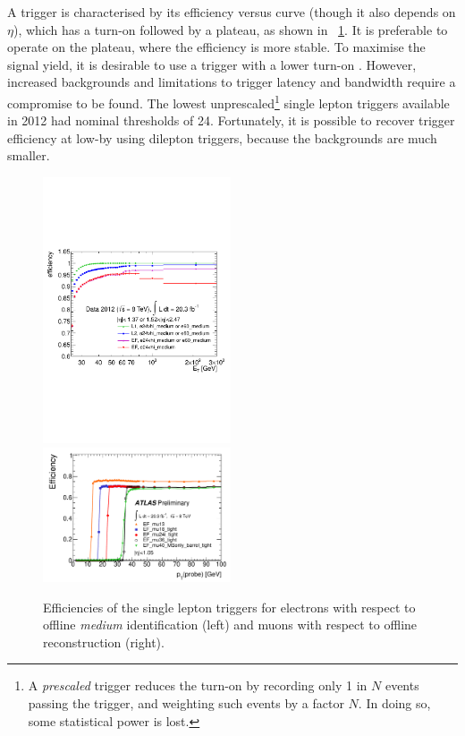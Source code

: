 A trigger is characterised by its efficiency versus \pt curve (though it also depends on 
$\eta$), which has a turn-on followed by a plateau, as shown in 
\Figure~\ref{fig:sel:trig_eff}. It is preferable to operate on the plateau, where the 
efficiency is more stable. To maximise the signal yield, it is desirable to use a trigger 
with a lower turn-on \pt. However, increased backgrounds and limitations to trigger 
latency and bandwidth require a compromise to be found. The lowest unprescaled\footnote{
	A \textit{prescaled} trigger reduces the turn-on \pt by recording only 1 in $N$ 
	events passing the trigger, and weighting such events by a factor $N$. In doing so, 
	some statistical power is lost.
}
single lepton triggers available in 2012 had nominal \pt thresholds of \unit{24}{\GeV}. 
Fortunately, it is possible to recover trigger efficiency at low-\pt by using dilepton 
triggers, because the backgrounds are much smaller.

\begin{figure}
	\includegraphics[width=0.495\textwidth]{tex/selection/trigger_eff_el}
	\hfill
	\includegraphics[width=0.495\textwidth]{tex/selection/trigger_eff_mu}
	\caption{Efficiencies of the single lepton triggers for electrons with respect to 
	offline \textit{medium} identification (left) and muons with respect to offline 
	reconstruction (right).}
	\label{fig:sel:trig_eff}
\end{figure}

